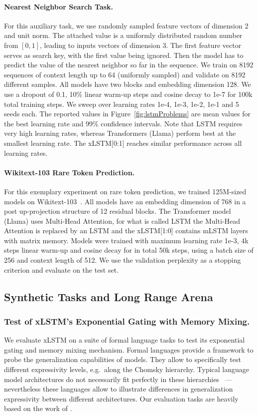 \documentclass[dvipsnames]{article}
\begin{document}
\begin{appendix}
\paragraph{Nearest Neighbor Search Task.}
\label{sec:appNearestNeighborSearch}
For this auxiliary task, we use randomly sampled feature vectors of dimension 2 and unit norm.
The attached value is a uniformly distributed random number from $[0, 1]$, leading to inputs vectors of dimension 3.
The first feature vector serves as search key, with the first value being ignored.
Then the model has to predict the value of the nearest neighbor so far in the sequence.
We train on 8192 sequences of context length up to 64 (uniformly sampled) and validate on 8192 different samples.
All models have two blocks and embedding dimension 128.
We use a dropout of 0.1, 10\% linear warm-up steps and cosine decay to 1e-7 for 100k total training steps.
We sweep over learning rates 1e-4, 1e-3, 1e-2, 1e-1 and 5 seeds each.
The reported values in Figure~\ref{fig:lstmProblems} are mean values for the best learning rate and 99\% confidence intervals.
Note that LSTM requires very high learning rates, whereas Transformers (Llama) perform best at the smallest learning rate.
The xLSTM[0:1] reaches similar performance across all learning rates.
\paragraph{Wikitext-103 Rare Token Prediction.}
\label{sec:appWiki103}
For this exemplary experiment on rare token prediction, we trained 125M-sized models on Wikitext-103~\citep{Merity:17}.
All models have an embedding dimension of 768 in a post up-projection structure of 12 residual blocks.
The Transformer model (Llama) uses Multi-Head Attention, for what is called LSTM the Multi-Head Attention is replaced by an LSTM
and the xLSTM[1:0] contains mLSTM layers with matrix memory.
Models were trained with maximum learning rate 1e-3, 4k steps linear warm-up and cosine decay for in total 50k steps, using a batch size of 256 and context length of 512.
We use the validation perplexity as a stopping criterion and evaluate on the test set.
\subsection{Synthetic Tasks and Long Range Arena}
\label{sec:appExpSynthetic}
\subsubsection{Test of xLSTM's Exponential Gating with Memory Mixing.}\label{sec:appExpSynthetic-formalLang}
We evaluate xLSTM on a suite of formal language tasks to test its exponential gating and memory mixing mechanism.
Formal languages provide a framework to probe the generalization capabilities of models.
They allow to specifically test different expressivity levels, e.g.\ along the Chomsky hierarchy.
Typical language model architectures do not necessarily fit perfectly in these hierarchies~\citep{Deletang:23} --- nevertheless these languages allow to illustrate differences in generalization expressivity between different architectures.
Our evaluation tasks are heavily based on the work of \citet{Deletang:23}.

\end{appendix}
\end{document}
